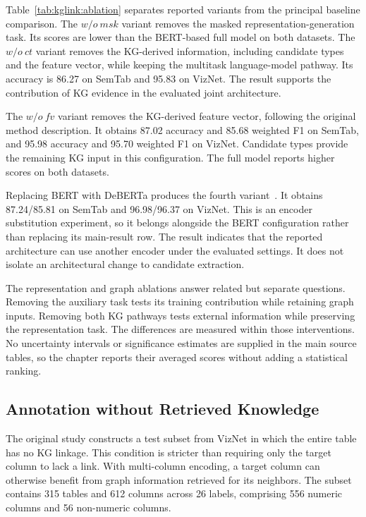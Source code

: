 Table~\ref{tab:kglink:ablation} separates reported variants from the principal baseline comparison. The $w/o\ msk$ variant removes the masked representation-generation task. Its scores are lower than the BERT-based full model on both datasets. The $w/o\ ct$ variant removes the KG-derived information, including candidate types and the feature vector, while keeping the multitask language-model pathway. Its accuracy is 86.27 on SemTab and 95.83 on VizNet. The result supports the contribution of KG evidence in the evaluated joint architecture.

The $w/o\ fv$ variant removes the KG-derived feature vector, following the original method description. It obtains 87.02 accuracy and 85.68 weighted F1 on SemTab, and 95.98 accuracy and 95.70 weighted F1 on VizNet. Candidate types provide the remaining KG input in this configuration. The full model reports higher scores on both datasets.

Replacing BERT with DeBERTa produces the fourth variant~\cite{kglink-he2020deberta}. It obtains 87.24/85.81 on SemTab and 96.98/96.37 on VizNet. This is an encoder substitution experiment, so it belongs alongside the BERT configuration rather than replacing its main-result row. The result indicates that the reported architecture can use another encoder under the evaluated settings. It does not isolate an architectural change to candidate extraction.

The representation and graph ablations answer related but separate questions. Removing the auxiliary task tests its training contribution while retaining graph inputs. Removing both KG pathways tests external information while preserving the representation task. The differences are measured within those interventions. No uncertainty intervals or significance estimates are supplied in the main source tables, so the chapter reports their averaged scores without adding a statistical ranking.

\subsection{Annotation without Retrieved Knowledge}
\label{sec:kglink:no-kg}

The original study constructs a test subset from VizNet in which the entire table has no KG linkage. This condition is stricter than requiring only the target column to lack a link. With multi-column encoding, a target column can otherwise benefit from graph information retrieved for its neighbors. The subset contains 315 tables and 612 columns across 26 labels, comprising 556 numeric columns and 56 non-numeric columns.

